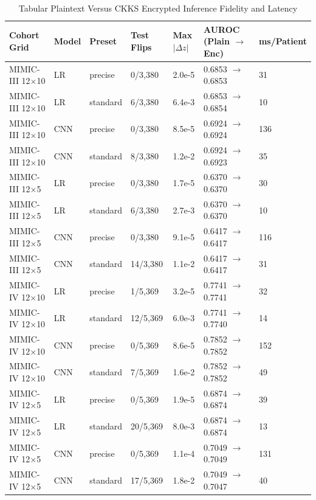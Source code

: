 \documentclass[conference]{IEEEtran}
\begin{document}
\begin{table}[t]
\caption{Tabular Plaintext Versus CKKS Encrypted Inference Fidelity and Latency}
\label{tab:tabular_enc}
\centering
\footnotesize
\begin{tabular}{L{2.2cm} C{0.8cm} C{1.0cm} C{1.2cm} C{1.0cm} C{2.2cm} C{1.2cm}}
\toprule
\textbf{Cohort Grid} & \textbf{Model} & \textbf{Preset} & \textbf{Test Flips} & \textbf{Max $|\Delta z|$} & \textbf{AUROC (Plain $\to$ Enc)} & \textbf{ms/Patient} \\
\midrule
MIMIC-III 12$\times$10 & LR & precise & 0/3,380 & 2.0e-5 & 0.6853 $\to$ 0.6853 & 31 \\
MIMIC-III 12$\times$10 & LR & standard & 6/3,380 & 6.4e-3 & 0.6853 $\to$ 0.6854 & 10 \\
MIMIC-III 12$\times$10 & CNN & precise & 0/3,380 & 8.5e-5 & 0.6924 $\to$ 0.6924 & 136 \\
MIMIC-III 12$\times$10 & CNN & standard & 8/3,380 & 1.2e-2 & 0.6924 $\to$ 0.6923 & 35 \\
\midrule
MIMIC-III 12$\times$5 & LR & precise & 0/3,380 & 1.7e-5 & 0.6370 $\to$ 0.6370 & 30 \\
MIMIC-III 12$\times$5 & LR & standard & 6/3,380 & 2.7e-3 & 0.6370 $\to$ 0.6370 & 10 \\
MIMIC-III 12$\times$5 & CNN & precise & 0/3,380 & 9.1e-5 & 0.6417 $\to$ 0.6417 & 116 \\
MIMIC-III 12$\times$5 & CNN & standard & 14/3,380 & 1.1e-2 & 0.6417 $\to$ 0.6417 & 31 \\
\midrule
MIMIC-IV 12$\times$10 & LR & precise & 1/5,369 & 3.2e-5 & 0.7741 $\to$ 0.7741 & 32 \\
MIMIC-IV 12$\times$10 & LR & standard & 12/5,369 & 6.0e-3 & 0.7741 $\to$ 0.7740 & 14 \\
MIMIC-IV 12$\times$10 & CNN & precise & 0/5,369 & 8.6e-5 & 0.7852 $\to$ 0.7852 & 152 \\
MIMIC-IV 12$\times$10 & CNN & standard & 7/5,369 & 1.6e-2 & 0.7852 $\to$ 0.7852 & 49 \\
\midrule
MIMIC-IV 12$\times$5 & LR & precise & 0/5,369 & 1.9e-5 & 0.6874 $\to$ 0.6874 & 39 \\
MIMIC-IV 12$\times$5 & LR & standard & 20/5,369 & 8.0e-3 & 0.6874 $\to$ 0.6874 & 13 \\
MIMIC-IV 12$\times$5 & CNN & precise & 0/5,369 & 1.1e-4 & 0.7049 $\to$ 0.7049 & 131 \\
MIMIC-IV 12$\times$5 & CNN & standard & 17/5,369 & 1.8e-2 & 0.7049 $\to$ 0.7047 & 40 \\
\bottomrule
\end{tabular}
\end{table}
\end{document}
